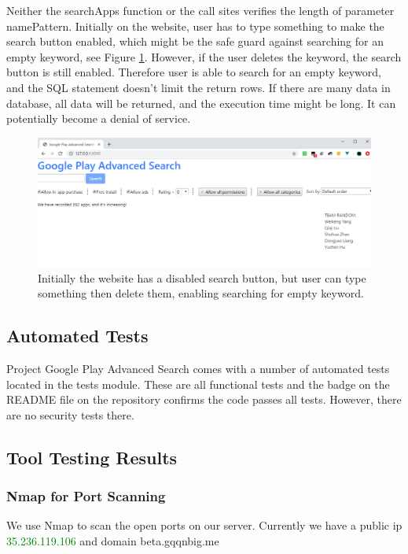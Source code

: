 \documentclass[12pt, a4paper]{article}
\begin{document}
Neither the searchApps function or the call sites verifies the length of parameter namePattern. Initially on the website, user has to type something to make the search button enabled, which might be the safe guard against searching for an empty keyword, see Figure \ref{fig:website-gray-buton}. However, if the user deletes the keyword, the search button is still enabled. Therefore user is able to search for an empty keyword, and the SQL statement doesn't limit the return rows. If there are many data in database, all data will be returned, and the execution time might be long. It can potentially become a denial of service.


\begin{figure}[ht]
\centering
\includegraphics[width=\textwidth]{website-gray-button.png}
\caption{Initially the website has a disabled search button, but user can type something then delete them, enabling searching for empty keyword.}
\label{fig:website-gray-buton}
\end{figure}

\subsection{Automated Tests}
Project Google Play Advanced Search comes with a number of automated tests located in the tests module. These are all functional tests and the badge on the README file on the repository confirms the code passes all tests. However, there are no security tests there.



\subsection{Tool Testing Results}
\subsubsection{Nmap for Port Scanning}
We use Nmap to scan the open ports on our server. Currently we have a public ip \textcolor{green}{35.236.119.106} and domain beta.gqqnbig.me
\end{document}
